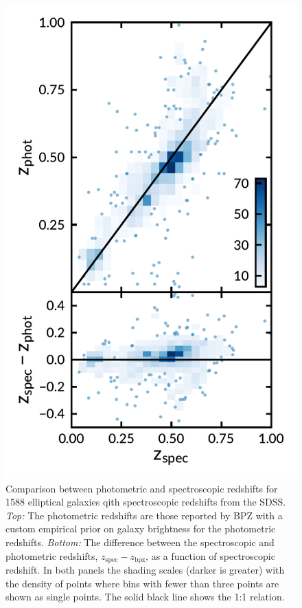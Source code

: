 \documentclass[apj, revtex4-1]{emulateapj}
\begin{document}
\begin{figure}
	\includegraphics[width=\columnwidth]{figures/specVSphot.pdf}
	\caption{Comparison between photometric and spectroscopic redshifts for 1588 elliptical galaxies qith spectroscopic redshifts from the SDSS. \textit{Top:} The photometric redshifts are those reported by BPZ with a custom empirical prior on galaxy brightness for the photometric redshifts. \textit{Bottom:} The difference between the spectroscopic and photometric redshifts, $z_\mathrm{spec} - z_\mathrm{bpz}$, as a function of spectroscopic redshift. In both panels the shading scales (darker is greater) with the density of points where bins with fewer than three points are shown as single points. The solid black line shows the 1:1 relation.}
	\label{fig:photozspecz}
\end{figure}
\end{document}
